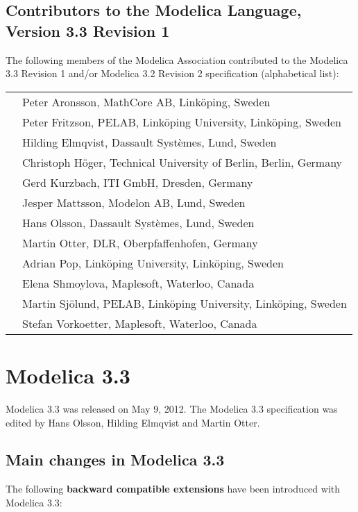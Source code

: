 \subsection{Contributors to the Modelica Language, Version 3.3 Revision 1}

The following members of the Modelica Association contributed to the
Modelica 3.3 Revision 1 and/or Modelica 3.2 Revision 2 specification
(alphabetical list):

\begin{longtable}{p{0.3cm}p{14cm}}
&Peter Aronsson, MathCore AB, Linköping, Sweden\\
&Peter Fritzson, PELAB, Linköping University, Linköping, Sweden\\
&Hilding Elmqvist, Dassault Systèmes, Lund, Sweden\\
&Christoph Höger, Technical University of Berlin, Berlin, Germany\\
&Gerd Kurzbach, ITI GmbH, Dresden, Germany\\
&Jesper Mattsson, Modelon AB, Lund, Sweden\\
&Hans Olsson, Dassault Systèmes, Lund, Sweden\\
&Martin Otter, DLR, Oberpfaffenhofen, Germany\\
&Adrian Pop, Linköping University, Linköping, Sweden\\
&Elena Shmoylova, Maplesoft, Waterloo, Canada\\
&Martin Sjölund, PELAB, Linköping University, Linköping, Sweden\\
&Stefan Vorkoetter, Maplesoft, Waterloo, Canada
\end{longtable}

\section{Modelica 3.3}

Modelica 3.3 was released on May 9, 2012. The Modelica 3.3 specification
was edited by Hans Olsson, Hilding Elmqvist and Martin Otter.

\subsection{Main changes in Modelica 3.3}

The following \textbf{backward compatible extensions} have been
introduced with Modelica 3.3:

